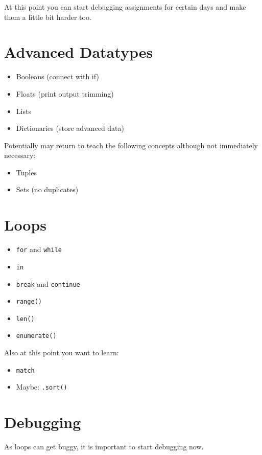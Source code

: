 \documentclass{article}
\begin{document}
At this point you can start debugging assignments for certain days and make them a little bit harder too.

\section{Advanced Datatypes}

\begin{itemize}
    \item Booleans (connect with if)
    \item Floats (print output trimming)
    \item Lists
    \item Dictionaries (store advanced data)
\end{itemize}

Potentially may return to teach the following concepts although not immediately necessary:

\begin{itemize}
    \item Tuples
    \item Sets (no duplicates)
\end{itemize}

\section{Loops}

\begin{itemize}
    \item \verb|for| and \verb|while|
    \item \verb|in|
    \item \verb|break| and \verb|continue|
    \item \verb|range()|
    \item \verb|len()|
    \item \verb|enumerate()| 
\end{itemize}

Also at this point you want to learn:

\begin{itemize}
    \item \verb|match|
    \item Maybe: \verb|.sort()|
\end{itemize}

\section{Debugging}
As loops can get buggy, it is important to start debugging now.
\end{document}

